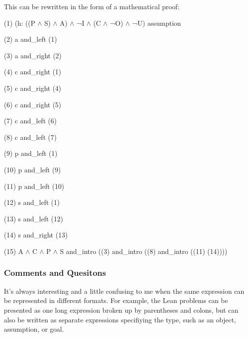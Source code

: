 \documentclass{article}
\theoremstyle{theorem}
\theoremstyle{definition}
\theoremstyle{remark}
\begin{document}
\begin{list}{}{A Lean Intro to Logic:}
  This can be rewritten in the form of a mathematical proof:
  \begin{center}
    \begin{list}{}{}
      \item{(1)} (h: ((P $\wedge$ S) $\wedge$ A) $\wedge$ ¬I $\wedge$ (C $\wedge$ ¬O) $\wedge$ ¬U) \hspace{1cm}assumption
      \item{(2)} a \hspace{1cm} and\_left (1)
      \item{(3)} a \hspace{1cm} and\_right (2)
      \item{(4)} c \hspace{1cm} and\_right (1)
      \item{(5)} c \hspace{1cm} and\_right (4)
      \item{(6)} c \hspace{1cm} and\_right (5)
      \item{(7)} c \hspace{1cm} and\_left (6)
      \item{(8)} c \hspace{1cm} and\_left (7)
      \item{(9)} p \hspace{1cm} and\_left (1)
      \item{(10)} p \hspace{1cm} and\_left (9)
      \item{(11)} p \hspace{1cm} and\_left (10)
      \item{(12)} s \hspace{1cm} and\_left (1)
      \item{(13)} s \hspace{1cm} and\_left (12)
      \item{(14)} s \hspace{1cm} and\_right (13)
      \item{(15)} A $\wedge$ C $\wedge$ P $\wedge$ S \hspace{1cm} and\_intro ((3) and\_intro ((8) and\_intro ((11) (14))))
    \end{list}
  \end{center}
\end{list}

\subsubsection{Comments and Quesitons}
It's always interesting and a little confusing to me when the same expression can be represented in different formats. For example, 
the Lean problems can be presented as one long expression broken up by parentheses
and colons, but can also be written as separate expressions specifiying the type, such as an object, assumption, or goal.  
\end{document}
